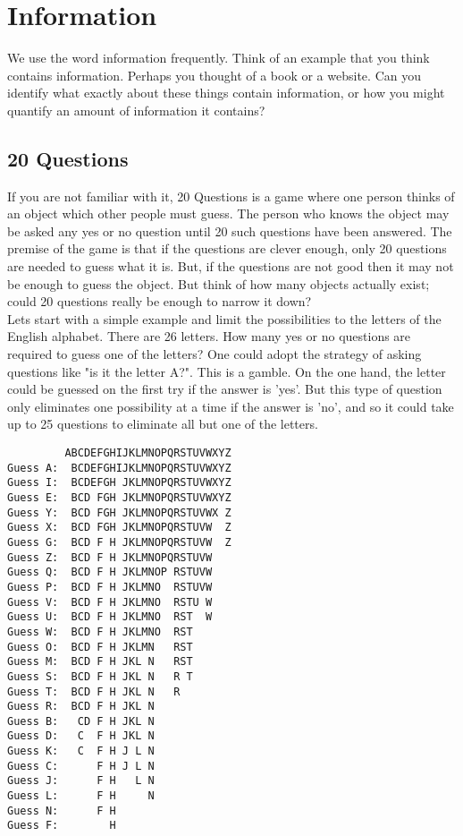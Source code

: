 \chapter{Information}

We use the word information frequently. Think of an example that you think contains information. Perhaps you thought of a book or a website. Can you identify what exactly about these things contain information, or how you might quantify an amount of information it contains?

\section{20 Questions}

If you are not familiar with it, 20 Questions is a game where one person thinks of an object which other people must guess. The person who knows the object may be asked any yes or no question until 20 such questions have been answered. The premise of the game is that if the questions are clever enough, only 20 questions are needed to guess what it is. But, if the questions are not good then it may not be enough to guess the object. But think of how many objects actually exist; could 20 questions really be enough to narrow it down?\\

Lets start with a simple example and limit the possibilities to the letters of the English alphabet. There are 26 letters. How many yes or no questions are required to guess one of the letters? One could adopt the strategy of asking questions like "is it the letter A?". This is a gamble. On the one hand, the letter could be guessed on the first try if the answer is 'yes'. But this type of question only eliminates one possibility at a time if the answer is 'no', and so it could take up to 25 questions to eliminate all but one of the letters.\\

\begin{verbatim}
         ABCDEFGHIJKLMNOPQRSTUVWXYZ
Guess A:  BCDEFGHIJKLMNOPQRSTUVWXYZ
Guess I:  BCDEFGH JKLMNOPQRSTUVWXYZ
Guess E:  BCD FGH JKLMNOPQRSTUVWXYZ
Guess Y:  BCD FGH JKLMNOPQRSTUVWX Z
Guess X:  BCD FGH JKLMNOPQRSTUVW  Z
Guess G:  BCD F H JKLMNOPQRSTUVW  Z
Guess Z:  BCD F H JKLMNOPQRSTUVW
Guess Q:  BCD F H JKLMNOP RSTUVW
Guess P:  BCD F H JKLMNO  RSTUVW
Guess V:  BCD F H JKLMNO  RSTU W
Guess U:  BCD F H JKLMNO  RST  W
Guess W:  BCD F H JKLMNO  RST
Guess O:  BCD F H JKLMN   RST
Guess M:  BCD F H JKL N   RST
Guess S:  BCD F H JKL N   R T
Guess T:  BCD F H JKL N   R  
Guess R:  BCD F H JKL N   
Guess B:   CD F H JKL N   
Guess D:   C  F H JKL N   
Guess K:   C  F H J L N   
Guess C:      F H J L N   
Guess J:      F H   L N
Guess L:      F H     N
Guess N:      F H
Guess F:        H
\end{verbatim}


